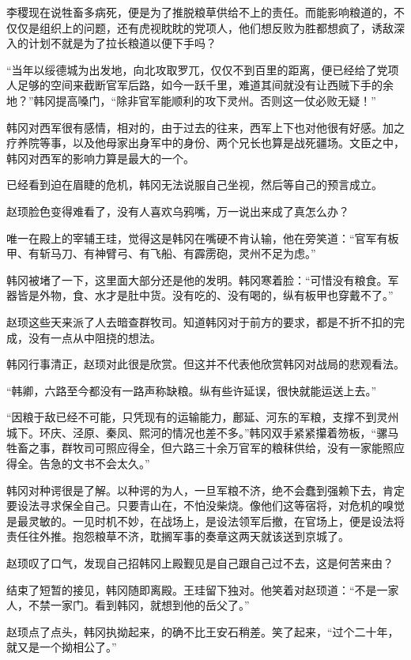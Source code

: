 李稷现在说牲畜多病死，便是为了推脱粮草供给不上的责任。而能影响粮道的，不仅仅是组织上的问题，还有虎视眈眈的党项人，他们想反败为胜都想疯了，诱敌深入的计划不就是为了拉长粮道以便下手吗？

“当年以绥德城为出发地，向北攻取罗兀，仅仅不到百里的距离，便已经给了党项人足够的空间来截断官军后路，如今一跃千里，难道其间就没有让西贼下手的余地？”韩冈提高嗓门，“除非官军能顺利的攻下灵州。否则这一仗必败无疑！”

韩冈对西军很有感情，相对的，由于过去的往来，西军上下也对他很有好感。加之疗养院等事，以及他母家出身军中的身份、两个兄长也算是战死疆场。文臣之中，韩冈对西军的影响力算是最大的一个。

已经看到迫在眉睫的危机，韩冈无法说服自己坐视，然后等自己的预言成立。

赵顼脸色变得难看了，没有人喜欢乌鸦嘴，万一说出来成了真怎么办？

唯一在殿上的宰辅王珪，觉得这是韩冈在嘴硬不肯认输，他在旁笑道：“官军有板甲、有斩马刀、有神臂弓、有飞船、有霹雳砲，灵州不足为虑。”

韩冈被堵了一下，这里面大部分还是他的发明。韩冈寒着脸：“可惜没有粮食。军器皆是外物，食、水才是肚中货。没有吃的、没有喝的，纵有板甲也穿戴不了。”

赵顼这些天来派了人去暗查群牧司。知道韩冈对于前方的要求，都是不折不扣的完成，没有一点从中阻挠的想法。

韩冈行事清正，赵顼对此很是欣赏。但这并不代表他欣赏韩冈对战局的悲观看法。

“韩卿，六路至今都没有一路声称缺粮。纵有些许延误，很快就能运送上去。”

“因粮于敌已经不可能，只凭现有的运输能力，鄜延、河东的军粮，支撑不到灵州城下。环庆、泾原、秦凤、熙河的情况也差不多。”韩冈双手紧紧攥着笏板，“骡马牲畜之事，群牧司可照应得全，但六路三十余万官军的粮秣供给，没有一家能照应得全。告急的文书不会太久。”

韩冈对种谔很是了解。以种谔的为人，一旦军粮不济，绝不会蠢到强赖下去，肯定要设法寻求保全自己。只要青山在，不怕没柴烧。像他们这等宿将，对危机的嗅觉是最灵敏的。一见时机不妙，在战场上，是设法领军后撤，在官场上，便是设法将责任往外推。抱怨粮草不济，耽搁军事的奏章这两天就该送到京城了。

赵顼叹了口气，发现自己招韩冈上殿觐见是自己跟自己过不去，这是何苦来由？

结束了短暂的接见，韩冈随即离殿。王珪留下独对。他笑着对赵顼道：“不是一家人，不禁一家门。看到韩冈，就想到他的岳父了。”

赵顼点了点头，韩冈执拗起来，的确不比王安石稍差。笑了起来，“过个二十年，就又是一个拗相公了。”

